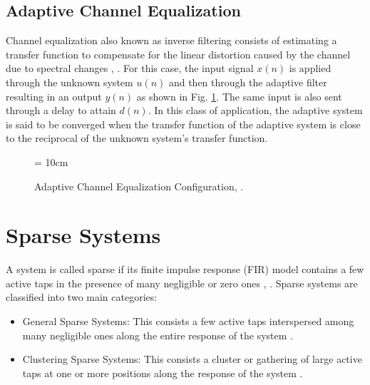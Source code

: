 \subsection{Adaptive Channel Equalization}\label{sec:1.3.4}
\vspace{-0.5cm}
\noindent Channel equalization also known as inverse filtering consists of estimating a transfer function to compensate for the linear distortion caused by the channel due to spectral changes \cite{Chitre}, \cite{gui1}. For this case, the input signal $x(n)$ is applied through the unknown system $u(n)$ and then through the adaptive filter resulting in an output $y(n)$ as shown in Fig. \ref{fig6x}. The same input is also sent through a delay to attain $d(n)$. In this class of application, the adaptive system is said to be converged when the transfer function of the adaptive system is close to the reciprocal of the unknown system's transfer function.
\begin{figure}[!htb]
\begin{center}
\vspace{1cm}
\epsfxsize = 10cm
\end{center}
\vspace{-1cm}
\caption{Adaptive Channel Equalization Configuration, \cite{shukur}.}
\label{fig6x}
\vspace{1.5cm}
\end{figure}

\vspace{-0.3cm}
\section{Sparse Systems}\label{sec:1.4}
\vspace{-0.5cm}
\noindent A system is called sparse if its finite impulse response (FIR) model contains a few active taps in the presence of many negligible or zero ones \cite{Gay}, \cite{Douglas}. Sparse systems are classiﬁed into two main categories:
\vspace{-0.6cm}
\begin{itemize}
  \item General Sparse Systems: This consists a few active taps  interspersed among many negligible ones along the entire response of the system \cite{Hero}.
      \vspace{-0.3cm}
  \item Clustering Sparse Systems: This consists a cluster or gathering of large active taps at one or more positions along the response of the system \cite{Qing}.
      \vspace{-0.3cm}
\end{itemize}

